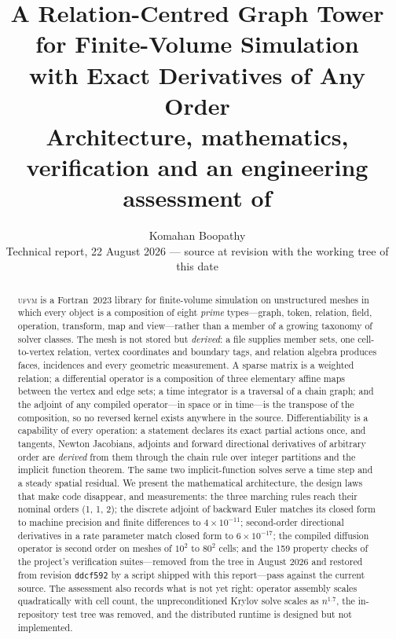 \documentclass[11pt,a4paper]{article}
\title{\textbf{A Relation-Centred Graph Tower for Finite-Volume Simulation\\ with Exact Derivatives of Any Order}\\[4pt]
\large Architecture, mathematics, verification and an engineering assessment of \ufvm}
\author{Komahan Boopathy\\ \small Technical report, 22 August 2026 --- source at revision \code{db3e31f} with the working tree of this date}
\date{}
\newcommand{\code}[1]{\texttt{#1}}
\newcommand{\ufvm}{\textsc{ufvm}}
\begin{document}
\maketitle

\begin{abstract}
\ufvm{} is a Fortran~2023 library for finite-volume simulation on unstructured meshes in which every object is a composition of eight \emph{prime} types---graph, token, relation, field, operation, transform, map and view---rather than a member of a growing taxonomy of solver classes. The mesh is not stored but \emph{derived}: a file supplies member sets, one cell-to-vertex relation, vertex coordinates and boundary tags, and relation algebra produces faces, incidences and every geometric measurement. A sparse matrix is a weighted relation; a differential operator is a composition of three elementary affine maps between the vertex and edge sets; a time integrator is a traversal of a chain graph; and the adjoint of any compiled operator---in space or in time---is the transpose of the composition, so no reversed kernel exists anywhere in the source. Differentiability is a capability of every operation: a statement declares its exact partial actions once, and tangents, Newton Jacobians, adjoints and forward directional derivatives of arbitrary order are \emph{derived} from them through the chain rule over integer partitions and the implicit function theorem. The same two implicit-function solves serve a time step and a steady spatial residual. We present the mathematical architecture, the design laws that make code disappear, and measurements: the three marching rules reach their nominal orders (1, 1, 2); the discrete adjoint of backward Euler matches its closed form to machine precision and finite differences to $4\times10^{-11}$; second-order directional derivatives in a rate parameter match closed form to $6\times10^{-17}$; the compiled diffusion operator is second order on meshes of $10^2$ to $80^2$ cells; and the 159 property checks of the project's verification suites---removed from the tree in August 2026 and restored from revision \code{ddcf592} by a script shipped with this report---pass against the current source. The assessment also records what is not yet right: operator assembly scales quadratically with cell count, the unpreconditioned Krylov solve scales as $n^{1.7}$, the in-repository test tree was removed, and the distributed runtime is designed but not implemented.
\end{abstract}

\tableofcontents
\end{document}
